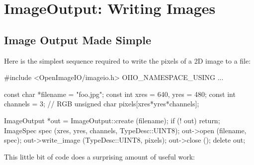 \chapter{ImageOutput: Writing Images}
\label{chap:imageoutput}


\section{Image Output Made Simple}
\label{sec:imageoutput:simple}

Here is the simplest sequence required to write the pixels of a 2D image
to a file:

\begin{code}
        #include <OpenImageIO/imageio.h>
        OIIO_NAMESPACE_USING
        ...

        const char *filename = "foo.jpg";
        const int xres = 640, yres = 480;
        const int channels = 3;  // RGB
        unsigned char pixels[xres*yres*channels];

        ImageOutput *out = ImageOutput::create (filename);
        if (! out)
            return;
        ImageSpec spec (xres, yres, channels, TypeDesc::UINT8);
        out->open (filename, spec);
        out->write_image (TypeDesc::UINT8, pixels);
        out->close ();
        delete out;
\end{code}

\noindent This little bit of code does a surprising amount of useful work:  

